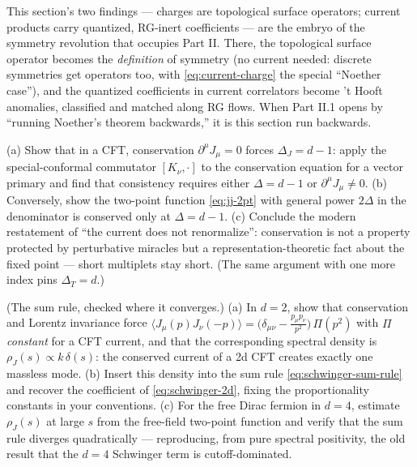\begin{ppreview}
This section's two findings --- charges are topological surface operators;
current products carry quantized, RG-inert coefficients --- are the embryo of
the symmetry revolution that occupies Part II. There, the topological
surface operator becomes the \emph{definition} of symmetry (no current
needed: discrete symmetries get operators too, with \eqref{eq:current-charge}
the special ``Noether case''), and the quantized coefficients in current
correlators become 't Hooft anomalies, classified and matched along RG flows.
When Part II.1 opens by ``running Noether's theorem backwards,'' it is this
section run backwards.
\end{ppreview}

\begin{exercise}[medium]
\label{exr:current-dimension}
(a) Show that in a CFT, conservation $\partial^\mu J_\mu = 0$ forces $\Delta_J
= d-1$: apply the special-conformal commutator $[K_\nu, \cdot]$ to the
conservation equation for a vector primary and find that consistency requires
either $\Delta = d - 1$ or $\partial^\mu J_\mu \neq 0$. (b) Conversely, show
the two-point function \eqref{eq:jj-2pt} with general power $2\Delta$ in the
denominator is conserved only at $\Delta = d-1$. (c) Conclude the modern
restatement of ``the current does not renormalize'': conservation is not a
property protected by perturbative miracles but a representation-theoretic
fact about the fixed point --- short multiplets stay short. (The same
argument with one more index pins $\Delta_T = d$.)
\end{exercise}

\begin{exercise}[medium]
\label{exr:sum-rule}
(The sum rule, checked where it converges.) (a) In $d = 2$, show that
conservation and Lorentz invariance force $\langle J_\mu(p) J_\nu(-p)\rangle
= \big(\delta_{\mu\nu} - \frac{p_\mu p_\nu}{p^2}\big)\,\Pi(p^2)$ with $\Pi$
\emph{constant} for a CFT current, and that the corresponding spectral
density is $\rho_J(s) \propto k\,\delta(s)$: the conserved current of a 2d
CFT creates exactly one massless mode. (b) Insert this density into the
sum rule \eqref{eq:schwinger-sum-rule} and recover the coefficient of
\eqref{eq:schwinger-2d}, fixing the proportionality constants in your
conventions. (c) For the free Dirac fermion in $d = 4$, estimate
$\rho_J(s)$ at large $s$ from the free-field two-point function and verify
that the sum rule diverges quadratically --- reproducing, from pure
spectral positivity, the old result that the $d=4$ Schwinger term is
cutoff-dominated.
\end{exercise}

